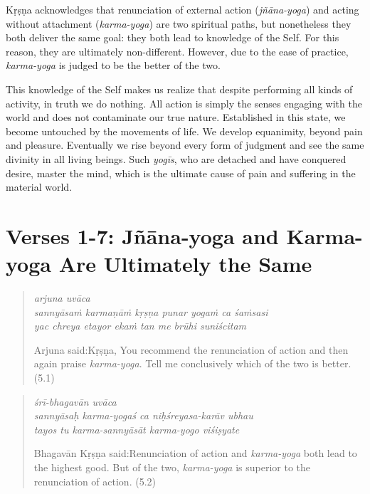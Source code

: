 \documentclass[12pt, twoside, openright]{memoir}
\begin{document}
\noindent Kṛṣṇa acknowledges that renunciation of external action (\textit{jñāna-yoga}) and acting without attachment (\textit{karma-yoga}) are two spiritual paths, but nonetheless they both deliver the same goal: they both lead to knowledge of the Self. For this reason, they are ultimately non-different. However, due to the ease of practice, \textit{karma-yoga} is judged to be the better of the two.

This knowledge of the Self makes us realize that despite performing all kinds of activity, in truth we do nothing. All action is simply the senses engaging with the world and does not contaminate our true nature. Established in this state, we become untouched by the movements of life. We develop equanimity, beyond pain and pleasure. Eventually we rise beyond every form of judgment and see the same divinity in all living beings. Such \textit{yogīs}, who are detached and have conquered desire, master the mind, which is the ultimate cause of pain and suffering in the material world.

\section{Verses 1-7: Jñāna-yoga and Karma-yoga Are Ultimately the Same}


\par
\begin{verse}
\textit{arjuna uvāca} \\
\textit{sannyāsaṁ karmaṇāṁ kṛṣṇa punar yogaṁ ca śaṁsasi} \\
\textit{yac chreya etayor ekaṁ tan me brūhi suniścitam}

\noindent \quad Arjuna said:\linebreak Kṛṣṇa, You recommend the renunciation of action and then again praise \textit{karma-yoga}. Tell me conclusively which of the two is better. (5.1)
\end{verse}
\par



\par
\begin{verse}
\textit{śrī-bhagavān uvāca} \\
\textit{sannyāsaḥ karma-yogaś ca niḥśreyasa-karāv ubhau} \\
\textit{tayos tu karma-sannyāsāt karma-yogo viśiṣyate}

\noindent \quad Bhagavān Kṛṣṇa said:\linebreak Renunciation of action and \textit{karma-yoga} both lead to the highest good. But of the two, \textit{karma-yoga} is superior to the renunciation of action. (5.2)
\end{verse}
\par
\end{document}
